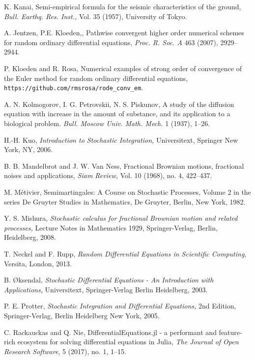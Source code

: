 \documentclass[reqno,12pt]{amsart}
\theoremstyle{plain} %
\theoremstyle{definition} %
\begin{document}
\begin{thebibliography}{25}
     K. Kanai, Semi-empirical formula for the seismic characteristics of the ground, \emph{Bull. Earthq. Res. Inst.,} Vol. 35 (1957), University of Tokyo.

     A. Jentzen, P.E. Kloeden,, Pathwise convergent higher order numerical schemes for random ordinary differential equations, \emph{Proc. R. Soc. A} 463 (2007), 2929--2944.

     P. Kloeden and R. Rosa, Numerical examples of strong order of convergence of the Euler method for random ordinary differential equations, \texttt{https://github.com/rmsrosa/rode\_conv\_em}.

     A. N. Kolmogorov, I. G. Petrovskii, N. S. Piskunov, A study of the diffusion equation with increase in the amount of substance, and its application to a biological problem. \emph{Bull. Moscow Univ. Math. Mech.} 1 (1937), 1--26.

     H.-H. Kuo, \emph{Introduction to Stochastic Integration,} Universitext, Springer New York, NY, 2006.

     B. B. Mandelbrot and J. W. Van Ness, Fractional Brownian motions, fractional noises and applications, \emph{Siam Review,} Vol. 10 (1968), no. 4, 422--437.

     M. M\'etivier, Semimartingales: A Course on Stochastic Processes, Volume 2 in the series De Gruyter Studies in Mathematics, De Gruyter, Berlin, New York, 1982.

     Y. S. Mishura, \emph{Stochastic calculus for fractional Brownian motion and related processes,} Lecture Notes in Mathematics 1929, Springer-Verlag, Berlin, Heidelberg, 2008.

     T. Neckel and F. Rupp, \emph{Random Differential Equations in Scientific Computing,} Versita, London, 2013.

     B. {\O}ksendal, \emph{Stochastic Differential Equations - An Introduction with Applications,} Universitext, Springer-Verlag Berlin Heidelberg, 2003.

     P. E. Protter, \emph{Stochastic Integration and Differential Equations,} 2nd Edition, Springer-Verlag, Berlin Heidelberg New York, 2005.

     C. Rackauckas and Q. Nie, DifferentialEquations.jl - a performant and feature-rich ecosystem for solving differential equations in Julia, \emph{The Journal of Open Research Software}, 5 (2017), no. 1, 1--15.


\end{thebibliography}
\end{document}
